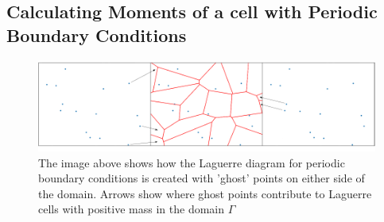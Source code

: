 \subsection{Calculating Moments of a cell with Periodic Boundary Conditions}
\begin{figure}[ht!]
	\centering
	\includegraphics[width=1\linewidth]{project/laguerre_diagram_OTPw_periodic}
	\caption[Periodic boundary conditions with 'ghost' points]{The image above shows how the Laguerre diagram for periodic boundary conditions is created with 'ghost' points on either side of the domain. Arrows show where ghost points contribute to Laguerre cells with positive mass in the domain $\Gamma$}
\end{figure}

